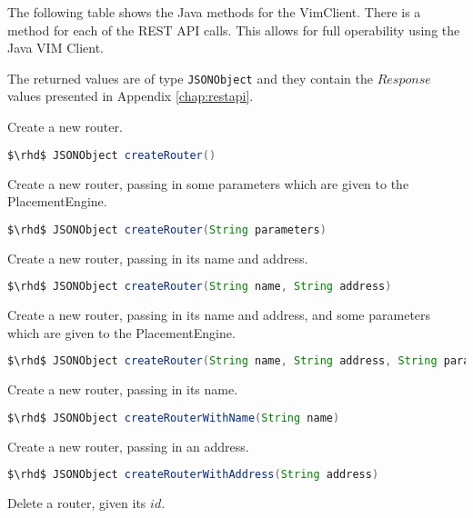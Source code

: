 The following table shows the  Java methods for the VimClient.
There is a method for each of the REST API calls.  This allows for
full operability using the Java VIM Client.

The returned values are of type \texttt{JSONObject} and they contain
the $Response$ values presented in Appendix \ref{chap:restapi}.

\vspace{\baselineskip}

\noindent Create a new router.

\begin{lstlisting}[language=Java]
    $\rhd$ JSONObject createRouter()
\end{lstlisting}

\noindent Create a new router, passing in some parameters which
are given to the PlacementEngine.

\begin{lstlisting}[language=Java]
    $\rhd$ JSONObject createRouter(String parameters)
\end{lstlisting}

\noindent Create a new router, passing in its name and address.

\begin{lstlisting}[language=Java]
    $\rhd$ JSONObject createRouter(String name, String address)
\end{lstlisting}

\noindent Create a new router, passing in its name and address,
and  some parameters which are given to the PlacementEngine.

\begin{lstlisting}[language=Java]
    $\rhd$ JSONObject createRouter(String name, String address, String parameters)
\end{lstlisting}

\noindent Create a new router, passing in its name.

\begin{lstlisting}[language=Java]
    $\rhd$ JSONObject createRouterWithName(String name)
\end{lstlisting}

\noindent Create a new router, passing in an address.

\begin{lstlisting}[language=Java]
    $\rhd$ JSONObject createRouterWithAddress(String address)
\end{lstlisting}

\noindent Delete a router, given its $id$.

